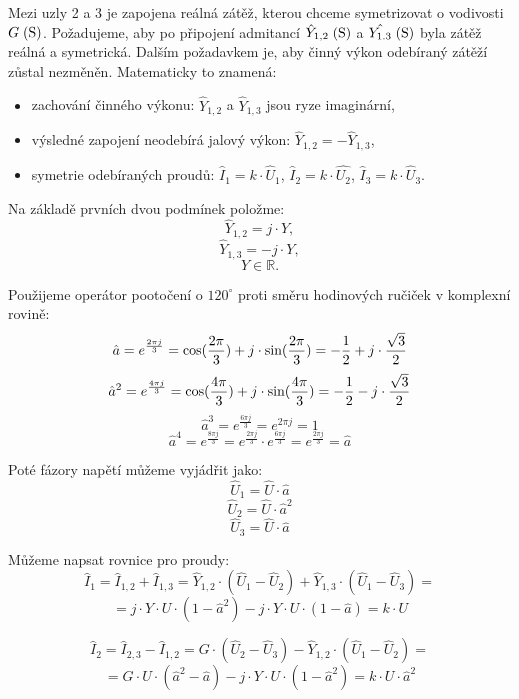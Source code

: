 \documentclass{article}
\begin{document}
Mezi uzly 2 a 3 je zapojena reálná zátěž, kterou chceme symetrizovat o vodivosti $G \; (\textrm{S}) $. Požadujeme, aby po připojení admitancí $\hat{Y}_{1,2} \; (\textrm{S})$ a $\hat{Y_{1.3}} \; (\textrm{S})$ byla zátěž reálná a symetrická. Dalším požadavkem je, aby činný výkon odebíraný zátěží zůstal nezměněn. Matematicky to znamená:
\begin{itemize}
    \item zachování činného výkonu: $\hat{Y}_{1,2}$ a $\hat{Y}_{1,3}$ jsou ryze imaginární,
    \item výsledné zapojení neodebírá jalový výkon: $\hat{Y}_{1,2} = - \hat{Y}_{1,3}$,
    \item symetrie odebíraných proudů: $\hat{I}_1 = k \cdot \hat{U}_1$, $\hat{I}_2 = k \cdot \hat{U_2}$, $\hat{I}_3 = k \cdot \hat{U}_3$.
\end{itemize}

Na základě prvních dvou podmínek položme:
$$
    \hat{Y}_{1,2} = j \cdot Y,
$$
$$
    \hat{Y}_{1,3} = -j \cdot Y,
$$
$$
    Y \in \mathbb{R}.
$$

Použijeme operátor pootočení o $120^\circ$ proti směru hodinových ručiček v komplexní rovině:
$$
    \hat{a} = e^{\frac{2 \pi j}{3}} = \textrm{cos}(\frac{2 \pi}{3}) + j \cdot \textrm{sin}(\frac{2 \pi}{3}) = -\frac{1}{2} + j \cdot \frac{\sqrt{3}}{2}
$$
$$
    \hat{a}^2 = e^{\frac{4 \pi j}{3}} = \textrm{cos}(\frac{4 \pi}{3}) + j \cdot \textrm{sin}(\frac{4 \pi}{3}) = -\frac{1}{2} - j \cdot \frac{\sqrt{3}}{2}
$$
$$
    \hat{a}^3 = e^{\frac{6 \pi j}{3}} = e^{2 \pi j} = 1
$$
$$
    \hat{a}^4 = e^{\frac{8 \pi j}{3}} = e^{\frac{2 \pi j}{3}} \cdot e^{\frac{6 \pi j}{3}} = e^{\frac{2 \pi j}{3}} = \hat{a}
$$

Poté fázory napětí můžeme vyjádřit jako:
$$
    \hat{U}_1 = \hat{U} \cdot \hat{a}
$$
$$
    \hat{U}_2 = \hat{U} \cdot \hat{a}^2
$$
$$
    \hat{U}_3 = \hat{U} \cdot \hat{a}
$$

Můžeme napsat rovnice pro proudy:
$$
    \hat{I}_1 = \hat{I}_{1,2} + \hat{I}_{1,3} = \hat{Y}_{1,2} \cdot \left( \hat{U}_1 - \hat{U}_2 \right) + \hat{Y}_{1,3} \cdot \left( \hat{U}_1 - \hat{U}_3 \right) =
$$
$$
    = j \cdot Y \cdot U \cdot \left( 1 - \hat{a}^2 \right) - j \cdot Y \cdot U \cdot \left( 1 - \hat{a} \right) = k \cdot U
$$

$$
    \hat{I}_2 = \hat{I}_{2,3} - \hat{I}_{1,2} = G \cdot \left( \hat{U}_2 - \hat{U}_3 \right) - \hat{Y}_{1,2} \cdot \left( \hat{U}_1 - \hat{U}_2 \right) =
$$
$$
    = G \cdot U \cdot \left( \hat{a}^2 - \hat{a} \right) - j \cdot Y \cdot U \cdot \left( 1 - \hat{a}^2 \right) = k \cdot U \cdot \hat{a}^2
$$
\end{document}
